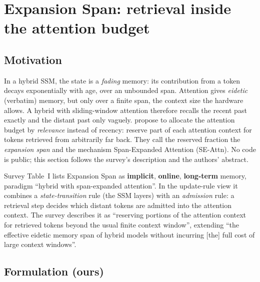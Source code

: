 \section{Expansion Span: retrieval inside the attention budget}\label{sec:c12-expansion}

\subsection{Motivation}

In a hybrid SSM, the state is a \emph{fading} memory: its contribution from a token decays
exponentially with age, over an unbounded span. Attention gives \emph{eidetic} (verbatim) memory,
but only over a finite span, the context size the hardware allows. A hybrid with sliding-window
attention therefore recalls the recent past exactly and the distant past only vaguely.
\citet{nunez2025expansion} propose to allocate the attention budget by \emph{relevance} instead of
recency: reserve part of each attention context for tokens retrieved from arbitrarily far back.
They call the reserved fraction the \emph{expansion span} and the mechanism Span-Expanded
Attention (SE-Attn). No code is public; this section follows the survey's description and the
authors' abstract.

\begin{taxonomy}
Survey Table~I \citep{zhoubian2026memory} lists Expansion Span as \textbf{implicit},
\textbf{online}, \textbf{long-term} memory, paradigm ``hybrid with span-expanded attention''. In
the update-rule view it combines a \emph{state-transition} rule (the SSM layers) with an
\emph{admission} rule: a retrieval step decides which distant tokens are admitted into the
attention context. The survey describes it as ``reserving portions of the attention context for
retrieved tokens beyond the usual finite context window'', extending ``the effective eidetic
memory span of hybrid models without incurring [the] full cost of large context windows''.
\end{taxonomy}

\subsection{Formulation (ours)}

